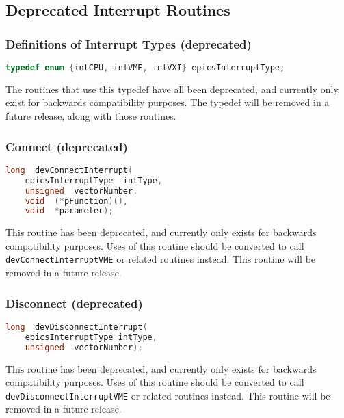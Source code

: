 \subsection{Deprecated Interrupt Routines}

\subsubsection{Definitions of Interrupt Types (deprecated)}

\begin{lstlisting}[language=C]
typedef enum {intCPU, intVME, intVXI} epicsInterruptType;
\end{lstlisting}

The routines that use this typedef have all been deprecated, and currently only exist for backwards compatibility purposes.
The typedef will be removed in a future release, along with those routines.

\subsubsection{Connect (deprecated)}

\begin{lstlisting}[language=C]
long  devConnectInterrupt(
    epicsInterruptType  intType,
    unsigned  vectorNumber,
    void  (*pFunction)(),
    void  *parameter);
\end{lstlisting}

This routine has been deprecated, and currently only exists for backwards compatibility purposes.
Uses of this routine should be converted to call \verb|devConnectInterruptVME| or related routines instead.
This routine will be removed in a future release.

\subsubsection{Disconnect (deprecated)}

\begin{lstlisting}[language=C]
long  devDisconnectInterrupt(
    epicsInterruptType intType,
    unsigned  vectorNumber);
\end{lstlisting}

This routine has been deprecated, and currently only exists for backwards compatibility purposes.
Uses of this routine should be converted to call \verb|devDisconnectInterruptVME| or related routines instead.
This routine will be removed in a future release.

